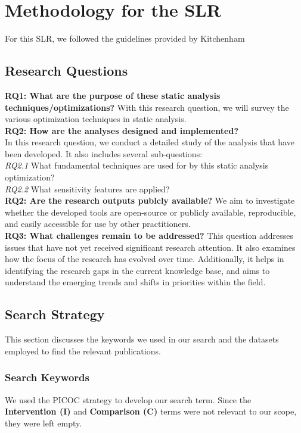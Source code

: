 \section{Methodology for the SLR}
For this SLR, we followed the guidelines provided by Kitchenham \cite{kitchenham2004procedures}

\subsection{Research Questions}

\textbf{RQ1: What are the purpose of these static analysis techniques/optimizations?}
With this research question, we will survey the various optimization techniques in static analysis. \\
\textbf{RQ2: How are the analyses designed and implemented?} \\
In this research question, we conduct a detailed study of the analysis that have been developed. It also includes several sub-questions:\\
\textit{RQ2.1} What fundamental techniques are used for by this static analysis optimization?\\
\textit{RQ2.2} What sensitivity features are applied?\\
\textbf{RQ2: Are the research outputs publcly available?}
We aim to investigate whether the developed tools are open-source or publicly available, reproducible, and easily accessible for use by other practitioners. \\
\textbf{RQ3: What challenges remain to be addressed?}
This question addresses issues that have not yet received significant research attention. It also examines how the focus of the research has evolved over time. 
Additionally, it helps in identifying the research gaps in the current knowledge base, and aims to understand the emerging trends and shifts in priorities within the field.

\subsection{Search Strategy}
This section discusses the keywords we used in our search and the datasets employed to find the relevant publications.

\subsubsection{Search Keywords}
We used the PICOC strategy to develop our search term. Since the \textbf{Intervention (I)} and \textbf{Comparison (C)} terms were not relevant to our scope, they were left empty.

